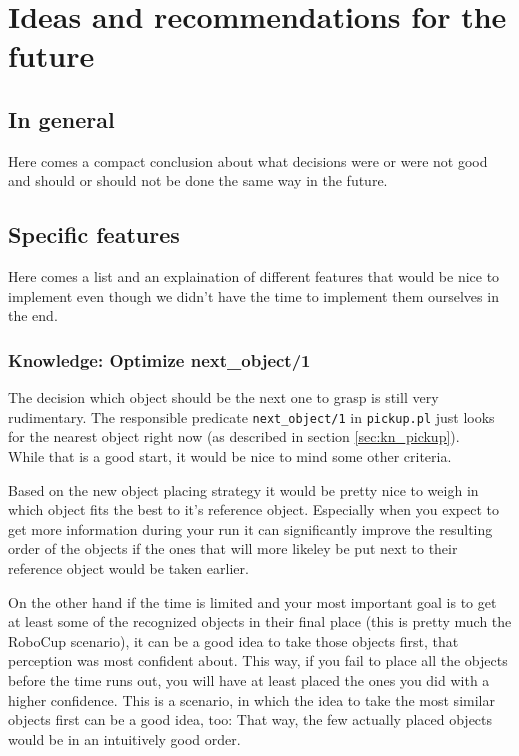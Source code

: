 \documentclass[main.tex]{subfiles}
\begin{document}
	\begingroup

	\renewcommand{\cleardoublepage}{}

	\renewcommand{\clearpage}{}

	\chapter{Ideas and recommendations for the future}
		
		\section{In general}
				\chapterauthor{}
		Here comes a compact conclusion about what decisions were or were not good and should or should not be done the same way in the future.
		
		\section{Specific features}
		Here comes a list and an explaination of different features that would be nice to implement even though we didn't have the time to implement them ourselves in the end.
	  	
	  	\subsection{Knowledge: Optimize next\_object/1}
	  	The decision which object should be the next one to grasp is still very rudimentary. The responsible predicate \texttt{next\_object/1} in \texttt{pickup.pl} just looks for the nearest object right now (as described in section \ref{sec:kn_pickup}).\\
	  	While that is a good start, it would be nice to mind some other criteria.
	  	
	  	Based on the new object placing strategy it would be pretty nice to weigh in which object fits the best to it's reference object. Especially when you expect to get more information during your run it can significantly improve the resulting order of the objects if the ones that will more likeley be put next to their reference object would be taken earlier.
	  	
	  	
		On the other hand if the time is limited and your most important goal is to get at least some of the recognized objects in their final place (this is pretty much the RoboCup scenario), it can be a good idea to take those objects first, that perception was most confident about. This way, if you fail to place all the objects before the time runs out, you will have at least placed the ones you did with a higher confidence. This is a scenario, in which the idea to take the most similar objects first can be a good idea, too: That way, the few actually placed objects would be in an intuitively good order.
		
\end{document}
